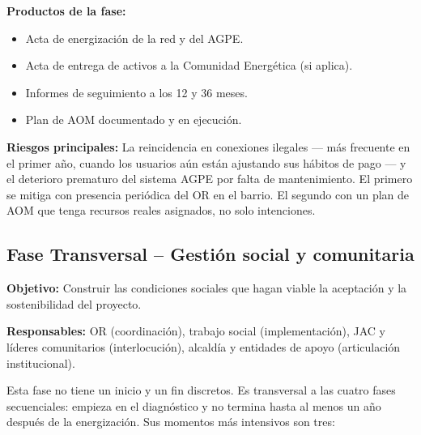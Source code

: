 \textbf{Productos de la fase:}
\begin{itemize}
    \item Acta de energización de la red y del AGPE.
    \item Acta de entrega de activos a la Comunidad Energética (si aplica).
    \item Informes de seguimiento a los 12 y 36 meses.
    \item Plan de AOM documentado y en ejecución.
\end{itemize}

\textbf{Riesgos principales:} La reincidencia en conexiones ilegales —
más frecuente en el primer año, cuando los usuarios aún están ajustando
sus hábitos de pago — y el deterioro prematuro del sistema AGPE por
falta de mantenimiento. El primero se mitiga con presencia periódica del
OR en el barrio. El segundo con un plan de AOM que tenga recursos reales
asignados, no solo intenciones.

\subsection{Fase Transversal -- Gestión social y comunitaria}
\label{subsec:fase_transversal}

\textbf{Objetivo:} Construir las condiciones sociales que hagan viable
la aceptación y la sostenibilidad del proyecto.

\textbf{Responsables:} OR (coordinación), trabajo social (implementación),
JAC y líderes comunitarios (interlocución), alcaldía y entidades de
apoyo (articulación institucional).

Esta fase no tiene un inicio y un fin discretos. Es transversal a las
cuatro fases secuenciales: empieza en el diagnóstico y no termina hasta
al menos un año después de la energización. Sus momentos más intensivos
son tres:

